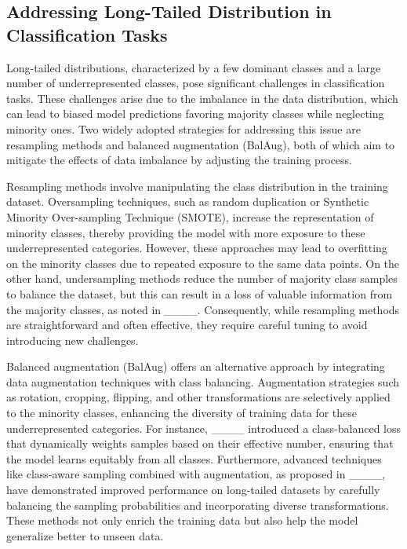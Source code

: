 \subsection{Addressing Long-Tailed Distribution in Classification Tasks}

Long-tailed distributions, characterized by a few dominant classes and a large number of underrepresented classes, pose significant challenges in classification tasks. These challenges arise due to the imbalance in the data distribution, which can lead to biased model predictions favoring majority classes while neglecting minority ones. Two widely adopted strategies for addressing this issue are resampling methods and balanced augmentation (BalAug), both of which aim to mitigate the effects of data imbalance by adjusting the training process.

Resampling methods involve manipulating the class distribution in the training dataset. Oversampling techniques, such as random duplication or Synthetic Minority Over-sampling Technique (SMOTE), increase the representation of minority classes, thereby providing the model with more exposure to these underrepresented categories. However, these approaches may lead to overfitting on the minority classes due to repeated exposure to the same data points. On the other hand, undersampling methods reduce the number of majority class samples to balance the dataset, but this can result in a loss of valuable information from the majority classes, as noted in ____. Consequently, while resampling methods are straightforward and often effective, they require careful tuning to avoid introducing new challenges.

Balanced augmentation (BalAug) offers an alternative approach by integrating data augmentation techniques with class balancing. Augmentation strategies such as rotation, cropping, flipping, and other transformations are selectively applied to the minority classes, enhancing the diversity of training data for these underrepresented categories. For instance, ____ introduced a class-balanced loss that dynamically weights samples based on their effective number, ensuring that the model learns equitably from all classes. Furthermore, advanced techniques like class-aware sampling combined with augmentation, as proposed in ____, have demonstrated improved performance on long-tailed datasets by carefully balancing the sampling probabilities and incorporating diverse transformations. These methods not only enrich the training data but also help the model generalize better to unseen data.


